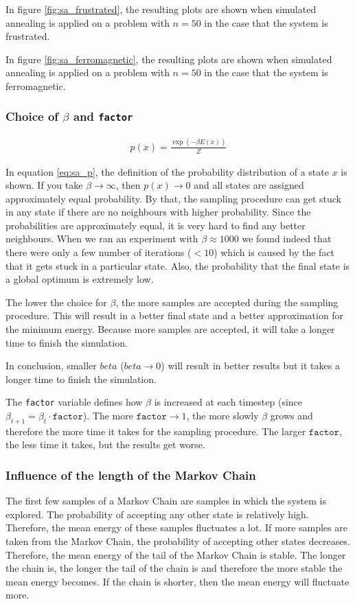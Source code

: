 \documentclass[10pt,a4paper]{article}
\begin{document}
In figure \ref{fig:sa_frustrated}, the resulting plots are shown when simulated annealing is applied on a problem with $n=50$ in the case that the system is frustrated.

In figure \ref{fig:sa_ferromagnetic}, the resulting plots are shown when simulated annealing is applied on a problem with $n=50$ in the case that the system is ferromagnetic.

\subsubsection{Choice of $\beta$ and \texttt{factor}}

\begin{align}
p(x) = \frac{\exp(-\beta E(x))}{Z}
\label{eq:sa_p}
\end{align}

In equation \ref{eq:sa_p}, the definition of the probability distribution of a state $x$ is shown. If you take $\beta \rightarrow \infty$, then $p(x) \rightarrow 0$ and all states are assigned approximately equal probability. By that, the sampling procedure can get stuck in any state if there are no neighbours with higher probability. Since the probabilities are approximately equal, it is very hard to find any better neighbours. When we ran an experiment with $\beta \approx 1000$ we found indeed that there were only a few number of iterations ($< 10$) which is caused by the fact that it gets stuck in a particular state. Also, the probability that the final state is a global optimum is extremely low.

The lower the choice for $\beta$, the more samples are accepted during the sampling procedure. This will result in a better final state and a better approximation for the minimum energy. Because more samples are accepted, it will take a longer time to finish the simulation.

In conclusion, smaller $beta$ ($beta \rightarrow 0$) will result in better results but it takes a longer time to finish the simulation.

The \texttt{factor} variable defines how $\beta$ is increased at each timestep (since $\beta_{t + 1} = \beta_t \cdot \texttt{factor}$). The more $\texttt{factor} \rightarrow 1$, the more slowly $\beta$ grows and therefore the more time it takes for the sampling procedure. The larger $\texttt{factor}$, the less time it takes, but the results get worse.

\subsubsection{Influence of the length of the Markov Chain}
The first few samples of a Markov Chain are samples in which the system is explored. The probability of accepting any other state is relatively high. Therefore, the mean energy of these samples fluctuates a lot. If more samples are taken from the Markov Chain, the probability of accepting other states decreases. Therefore, the mean energy of the tail of the Markov Chain is stable. The longer the chain is, the longer the tail of the chain is and therefore the more stable the mean energy becomes. If the chain is shorter, then the mean energy will fluctuate more.
\end{document}

